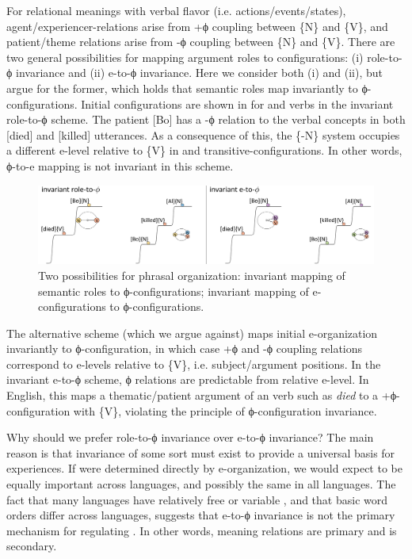 For relational meanings with verbal flavor (i.e. actions/events/states), agent/experiencer-relations arise from +ϕ coupling between \{N\} and \{V\}, and patient/theme relations arise from -ϕ coupling between \{N\} and \{V\}. There are two general possibilities for mapping argument roles to configurations: (i) role-to-ϕ invariance and (ii) e-to-ϕ invariance. Here we consider both (i) and (ii), but argue for the former, which holds that semantic roles map invariantly to ϕ-configurations. Initial configurations are shown in {} for  and  verbs in the invariant role-to-ϕ scheme. The patient [Bo] has a -ϕ relation to the verbal concepts in both  [died] and  [killed] utterances. As a consequence of this, the \{-N\} system occupies a different e-level relative to \{V\} in  and transitive-configurations. In other words, ϕ-to-e mapping is not invariant in this scheme.

  
\begin{figure}
\includegraphics[width=\textwidth]{figures/Tilsen-img71.png}
\caption{Two possibilities for phrasal organization: invariant mapping of semantic roles to ϕ-configurations; invariant mapping of e-configurations to ϕ-configurations.}
\label{fig:4:21}
\end{figure}
 

  The alternative scheme (which we argue against) maps initial e-organization invariantly to ϕ-configuration, in which case +ϕ and -ϕ coupling relations correspond to e-levels relative to \{V\}, i.e. subject/argument positions. In the invariant e-to-ϕ scheme, ϕ relations are predictable from relative e-level. In English, this maps a thematic/patient argument of an  verb such as \textit{died} to a +ϕ-configuration with \{V\}, violating the principle of ϕ-configuration invariance.

  Why should we prefer role-to-ϕ invariance over e-to-ϕ invariance? The main reason is that invariance of some sort must exist to provide a universal basis for  experiences. If  were determined directly by e-organization, we would expect  to be equally important across languages, and possibly the same in all languages. The fact that many languages have relatively free or variable , and that basic word orders differ across languages, suggests that e-to-ϕ invariance is not the primary mechanism for regulating . In other words, meaning relations are primary and  is secondary.

